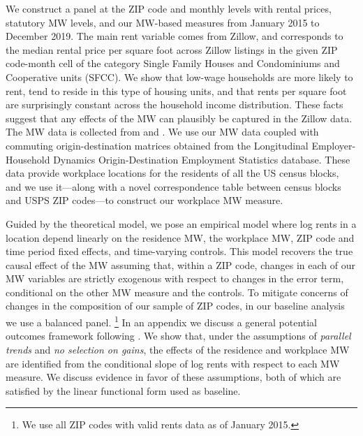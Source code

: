 We construct a panel at the ZIP code and monthly levels with rental prices, 
statutory MW levels, and our MW-based measures from January 2015 to December 2019.
The main rent variable comes from Zillow, and corresponds to the median 
rental price per square foot across Zillow listings in the given ZIP 
code-month cell of the category Single Family Houses and Condominiums and 
Cooperative units (SFCC).
We show that low-wage households are more likely to rent,
tend to reside in this type of housing units,
and that rents per square foot are surprisingly constant across the household
income distribution.
These facts suggest that any effects of the MW can plausibly be captured 
in the Zillow data.
The MW data is collected from \textcite{VaghulZipperer2016} and 
\textcite{BerkeleyLaborCenter}.
We use our MW data coupled with commuting origin-destination matrices obtained 
from the Longitudinal Employer-Household Dynamics Origin-Destination Employment 
Statistics \parencite[LODES;][]{CensusLODES} database.
These data provide workplace locations for the residents of all the US census 
blocks, and we use it---along with a novel correspondence table between 
census blocks and USPS ZIP codes---to construct our workplace MW measure.


Guided by the theoretical model, we pose an empirical model where log rents in 
a location depend linearly on
the residence MW, %
the workplace MW, %
ZIP code and time period fixed effects, and 
time-varying controls.
This model recovers the true causal effect of the MW assuming that, 
within a ZIP code, changes in each of our MW variables are 
strictly exogenous with respect to changes in the error term, 
conditional on the other MW measure and the controls.
To mitigate concerns of changes in the composition of our sample of ZIP codes, 
in our baseline analysis we use a balanced panel.%
\footnote{We use all ZIP codes with valid rents data as of January 2015.}
In an appendix we discuss a general potential outcomes framework following
\textcite{CallawayEtAl2021}.
We show that, under the assumptions of \textit{parallel trends} and 
\textit{no selection on gains}, 
the effects of the residence and workplace MW are identified from the 
conditional slope of log rents with respect to each MW measure.
We discuss evidence in favor of these assumptions, both of which are satisfied 
by the linear functional form used as baseline.

